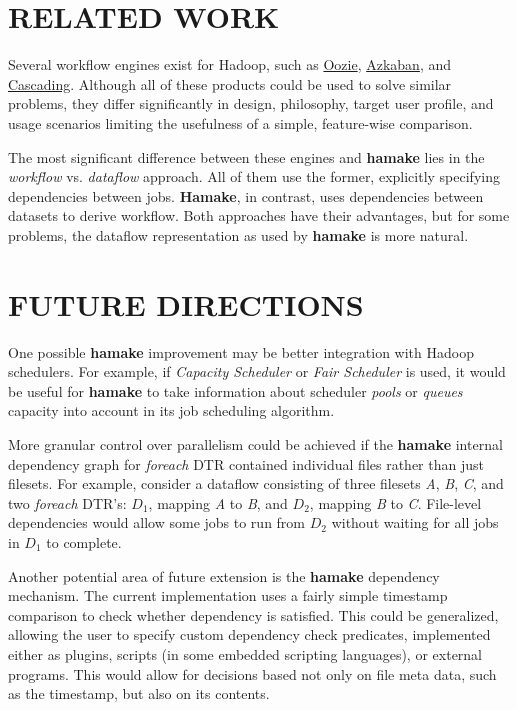 \documentclass[a4paper,twoside]{article}
\begin{document}
\section{\uppercase{Related Work}}

Several workflow engines exist for Hadoop, such as
\href{http://github.com/tucu00/oozie1}{Oozie},
\href{http://sna-projects.com/azkaban/}{Azkaban}, and
\href{http://www.cascading.org/}{Cascading}.  Although all of these
products could be used to solve similar problems, they differ
significantly in design, philosophy, target user profile, and usage
scenarios limiting the usefulness of a simple, feature-wise
comparison.

The most significant difference between these engines and \textbf{hamake}
lies in the \textit{workflow} vs. \textit{dataflow} approach. All of them
use the former, explicitly specifying dependencies between
jobs. \textbf{Hamake}, in contrast, uses dependencies between datasets to derive workflow. Both approaches have their advantages, but for some problems, the dataflow representation as used by
\textbf{hamake} is more natural.

\section{\uppercase{Future Directions}}

One possible \textbf{hamake} improvement may be better integration with Hadoop schedulers. For example, if \textit{Capacity Scheduler} or \textit{Fair Scheduler} is used, it would be useful for \textbf{hamake} to take information about scheduler \textit{pools} or \textit{queues} capacity into account in its job scheduling algorithm.

More granular control over parallelism could be achieved if the
\textbf{hamake} internal dependency graph for \emph{foreach} DTR
contained individual files rather than just filesets. For example, consider a
dataflow consisting of three filesets \textit{A}, \textit{B},
\textit{C}, and two \emph{foreach} DTR's: \textit{$D_1$}, mapping
\textit{A} to \textit{B}, and \textit{$D_2$}, mapping \textit{B} to
\textit{C}. File-level dependencies would allow some jobs to run from
\textit{$D_2$} without waiting for all jobs in \textit{$D_1$} to
complete.

Another potential area of future extension is the \textbf{hamake} dependency
mechanism. The current implementation uses a fairly simple timestamp
comparison to check whether dependency is satisfied. This could be
generalized, allowing the user to specify custom dependency check
predicates, implemented either as plugins, scripts 
(in some embedded
scripting languages), or external programs. This would allow for
decisions based not only on file meta data, such as the timestamp, but also on its contents.
\end{document}

